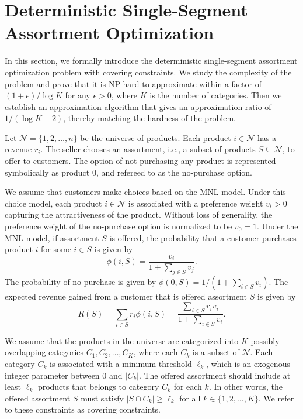 \documentclass[msom,non-blindrev]{informs3} %
\theoremstyle{definition}
\begin{document}
\section{Deterministic Single-Segment Assortment Optimization}\label{sec:deterministic_setting}

In this section, we formally introduce the deterministic single-segment assortment optimization problem with covering constraints. We study the complexity of the problem and prove that it is NP-hard to approximate within a factor of $(1+\epsilon)/\log K$ for any $\epsilon>0$, where $K$ is the number of categories. Then we establish an approximation algorithm that gives an approximation ratio of $1/(\log K+2)$, thereby matching the hardness of the problem.

Let $\mathcal{N}=\{1,2,\dots,n\}$ be the universe of products. Each product $i\in\mathcal{N}$ has a revenue $r_i$. The seller chooses an assortment, i.e., a subset of products $S\subseteq\mathcal{N}$, to offer to customers. The option of not purchasing any product is represented symbolically as product $0$, and refereed to as the no-purchase option.

We assume that  customers make choices based on the MNL model. Under this choice model, each product $i\in\mathcal{N}$ is associated with a preference weight $v_i>0$ capturing the attractiveness of the product. Without loss of generality, the preference weight of the no-purchase option is normalized to be $v_0=1$. Under the MNL model, if assortment $S$ is offered, the probability that a customer purchases product $i$ for some $i\in S$ is given by
\begin{equation*}
\phi(i,S)=\dfrac{v_i}{1+\sum_{j\in S}v_j}.
\end{equation*}
The probability of no-purchase is given by $\phi(0,S)={1}/({1+\sum_{i\in S}v_i})$. The expected revenue gained from a customer that is offered assortment $S$ is given by
\begin{equation}
R(S)=\sum_{i\in S}r_i\phi(i,S)=\dfrac{\sum_{i\in S}r_iv_i}{1+\sum_{i\in S}v_i}.\label{eq:revenue_mnl}
\end{equation}

We assume that the products in the universe are categorized into $K$ possibly overlapping categories $C_1,C_2,\dots,C_K$, where each $C_k$ is a subset of $\mathcal{N}$. Each category $C_k$ is associated with a minimum threshold $\ell_k$, which is an exogenous integer parameter between  $0$ and $ |C_k|$. The offered assortment should include at least $\ell_k$ products that belongs to category $C_k$ for each $k$. In other words, the offered assortment $S$ must satisfy $|S\cap C_k|\geq \ell_k$ for all $k\in\{1,2,\dots,K\}$. We refer to these constraints as covering constraints.
\end{document}
